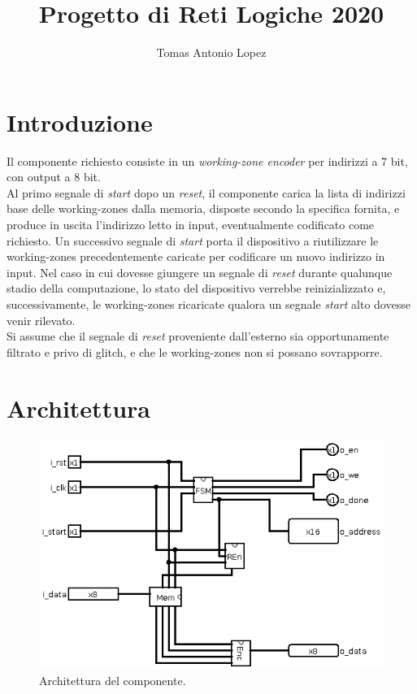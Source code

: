 \documentclass[11pt,a4paper]{article}
\title{\textbf{Progetto di Reti Logiche 2020}}
\author{Tomas Antonio Lopez}
\begin{document}
\maketitle
\tableofcontents
\listoffigures

\newpage

\section{Introduzione}
Il componente richiesto consiste in un \emph{working-zone encoder} per indirizzi a 7 bit, con output a 8 bit.\\
Al primo segnale di \emph{start} dopo un \emph{reset}, il componente carica la lista di indirizzi base delle working-zones dalla memoria, disposte
secondo la specifica fornita, e produce in uscita l'indirizzo letto in input, eventualmente codificato come richiesto. Un successivo segnale di
\emph{start} porta il dispositivo a riutilizzare le working-zones precedentemente caricate per codificare un nuovo indirizzo in input. Nel caso in cui
dovesse giungere un segnale di \emph{reset} durante qualunque stadio della computazione, lo stato del dispositivo verrebbe reinizializzato e,
successivamente, le working-zones ricaricate qualora un segnale \emph{start} alto dovesse venir rilevato.\\
Si assume che il segnale di \emph{reset} proveniente dall'esterno sia opportunamente filtrato e privo di glitch, e che le working-zones non si possano
sovrapporre.

\section{Architettura}
\begin{figure}[ht]
    \includegraphics[scale=0.65]{component.png}
    \caption[Il componente]{Architettura del componente.}
\end{figure}
\end{document}
